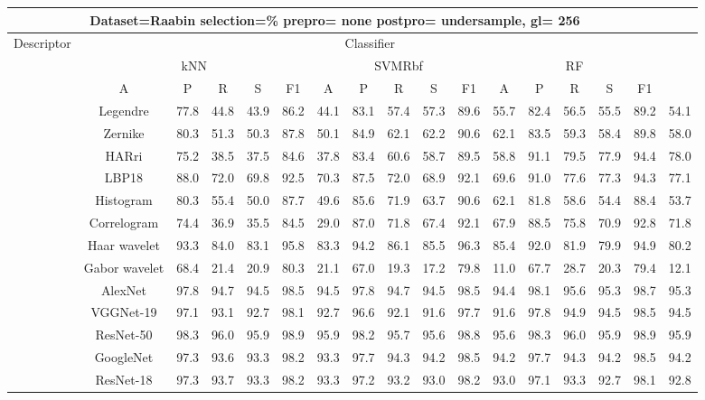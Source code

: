 \documentclass[12pt,italian]{article}
\begin{document}
\begin{tiny}
\begin{longtable}{lcccccccccccccccc}
\toprule
\multicolumn{16}{c}{Dataset=Raabin selection=\% prepro= none postpro= undersample, gl= 256} \\ 
\toprule
Descriptor & \multicolumn{15}{c}{Classifier} \\ 
& \multicolumn{5}{c}{kNN} & \multicolumn{5}{c}{SVMRbf} & \multicolumn{5}{c}{RF} \\ 
& A & P & R & S & F1 & A & P & R & S & F1 & A & P & R & S & F1 \\ 
\midrule
& Legendre & 77.8 & 44.8 & 43.9 & 86.2 & 44.1 & 83.1 & 57.4 & 57.3 & 89.6 & 55.7 & 82.4 & 56.5 & 55.5 & 89.2 & 54.1 \\ 
& Zernike & 80.3 & 51.3 & 50.3 & 87.8 & 50.1 & 84.9 & 62.1 & 62.2 & 90.6 & 62.1 & 83.5 & 59.3 & 58.4 & 89.8 & 58.0 \\ 
& HARri & 75.2 & 38.5 & 37.5 & 84.6 & 37.8 & 83.4 & 60.6 & 58.7 & 89.5 & 58.8 & 91.1 & 79.5 & 77.9 & 94.4 & 78.0 \\ 
& LBP18 & 88.0 & 72.0 & 69.8 & 92.5 & 70.3 & 87.5 & 72.0 & 68.9 & 92.1 & 69.6 & 91.0 & 77.6 & 77.3 & 94.3 & 77.1 \\ 
& Histogram & 80.3 & 55.4 & 50.0 & 87.7 & 49.6 & 85.6 & 71.9 & 63.7 & 90.6 & 62.1 & 81.8 & 58.6 & 54.4 & 88.4 & 53.7 \\ 
& Correlogram & 74.4 & 36.9 & 35.5 & 84.5 & 29.0 & 87.0 & 71.8 & 67.4 & 92.1 & 67.9 & 88.5 & 75.8 & 70.9 & 92.8 & 71.8 \\ 
& Haar wavelet & 93.3 & 84.0 & 83.1 & 95.8 & 83.3 & 94.2 & 86.1 & 85.5 & 96.3 & 85.4 & 92.0 & 81.9 & 79.9 & 94.9 & 80.2 \\ 
& Gabor wavelet & 68.4 & 21.4 & 20.9 & 80.3 & 21.1 & 67.0 & 19.3 & 17.2 & 79.8 & 11.0 & 67.7 & 28.7 & 20.3 & 79.4 & 12.1 \\ 
& AlexNet & 97.8 & 94.7 & 94.5 & 98.5 & 94.5 & 97.8 & 94.7 & 94.5 & 98.5 & 94.4 & 98.1 & 95.6 & 95.3 & 98.7 & 95.3 \\ 
& VGGNet-19 & 97.1 & 93.1 & 92.7 & 98.1 & 92.7 & 96.6 & 92.1 & 91.6 & 97.7 & 91.6 & 97.8 & 94.9 & 94.5 & 98.5 & 94.5 \\ 
& ResNet-50 & 98.3 & 96.0 & 95.9 & 98.9 & 95.9 & 98.2 & 95.7 & 95.6 & 98.8 & 95.6 & 98.3 & 96.0 & 95.9 & 98.9 & 95.9 \\ 
& GoogleNet & 97.3 & 93.6 & 93.3 & 98.2 & 93.3 & 97.7 & 94.3 & 94.2 & 98.5 & 94.2 & 97.7 & 94.3 & 94.2 & 98.5 & 94.2 \\ 
& ResNet-18 & 97.3 & 93.7 & 93.3 & 98.2 & 93.3 & 97.2 & 93.2 & 93.0 & 98.2 & 93.0 & 97.1 & 93.3 & 92.7 & 98.1 & 92.8 \\ 

\end{longtable}
\end{tiny}
\end{document}
